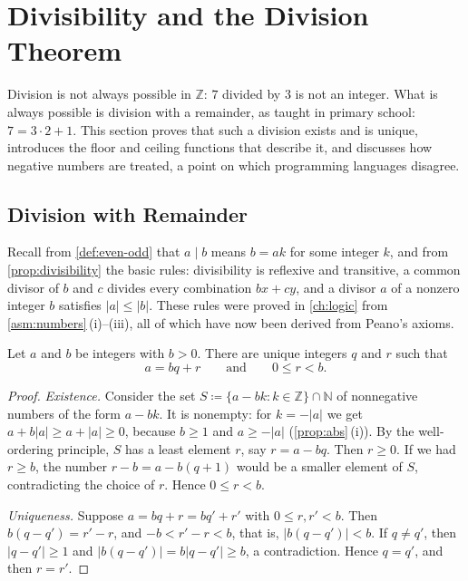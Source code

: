 \section{Divisibility and the Division Theorem}
\label{sec:division}

Division is not always possible in $\mathbb Z$: $7$ divided by $3$ is not an integer. What is always possible is division with a remainder, as taught in primary school: $7=3\cdot2+1$. This section proves that such a division exists and is unique, introduces the floor and ceiling functions that describe it, and discusses how negative numbers are treated, a point on which programming languages disagree.

\subsection{Division with Remainder}

Recall from \cref{def:even-odd} that $a\mid b$ means $b=ak$ for some integer $k$, and from \cref{prop:divisibility} the basic rules: divisibility is reflexive and transitive, a common divisor of $b$ and $c$ divides every combination $bx+cy$, and a divisor $a$ of a nonzero integer $b$ satisfies $|a|\le|b|$. These rules were proved in \cref{ch:logic} from \cref{asm:numbers}\,(i)--(iii), all of which have now been derived from Peano's axioms.

\begin{theorem}
\label{thm:division}
Let $a$ and $b$ be integers with $b>0$. There are unique integers $q$ and $r$ such that
\[
a=bq+r\qquad\text{and}\qquad0\le r<b .
\]
\end{theorem}

\begin{proof}
\emph{Existence.} Consider the set $S\coloneqq\{a-bk: k\in\mathbb Z\}\cap\mathbb N$ of nonnegative numbers of the form $a-bk$. It is nonempty: for $k=-|a|$ we get $a+b|a|\ge a+|a|\ge0$, because $b\ge1$ and $a\ge-|a|$ (\cref{prop:abs}\,(i)). By the well-ordering principle, $S$ has a least element $r$, say $r=a-bq$. Then $r\ge0$. If we had $r\ge b$, the number $r-b=a-b(q+1)$ would be a smaller element of $S$, contradicting the choice of $r$. Hence $0\le r<b$.

\emph{Uniqueness.} Suppose $a=bq+r=bq'+r'$ with $0\le r,r'<b$. Then $b(q-q')=r'-r$, and $-b<r'-r<b$, that is, $|b(q-q')|<b$. If $q\ne q'$, then $|q-q'|\ge1$ and $|b(q-q')|=b|q-q'|\ge b$, a contradiction. Hence $q=q'$, and then $r=r'$.
\end{proof}

